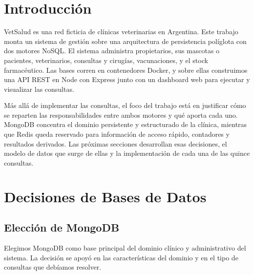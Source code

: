 \documentclass[10pt,a4paper]{article}
\let\oldsection\section
\renewcommand{\section}{\clearpage\oldsection}
\begin{document}
\section{Introducción}

VetSalud es una red ficticia de clínicas veterinarias en Argentina. Este trabajo monta un sistema de gestión sobre una arquitectura de persistencia políglota con dos motores NoSQL. El sistema administra propietarios, sus mascotas o pacientes, veterinarios, consultas y cirugías, vacunaciones, y el stock farmacéutico. Las bases corren en contenedores Docker, y sobre ellas construimos una API REST en Node con Express junto con un dashboard web para ejecutar y visualizar las consultas.

Más allá de implementar las consultas, el foco del trabajo está en justificar cómo se reparten las responsabilidades entre ambos motores y qué aporta cada uno. MongoDB concentra el dominio persistente y estructurado de la clínica, mientras que Redis queda reservado para información de acceso rápido, contadores y resultados derivados. Las próximas secciones desarrollan esas decisiones, el modelo de datos que surge de ellas y la implementación de cada una de las quince consultas.

\section{Decisiones de Bases de Datos}

\subsection{Elección de MongoDB}

Elegimos MongoDB como base principal del dominio clínico y administrativo del sistema. La decisión se apoyó en las características del dominio y en el tipo de consultas que debíamos resolver.
\end{document}
